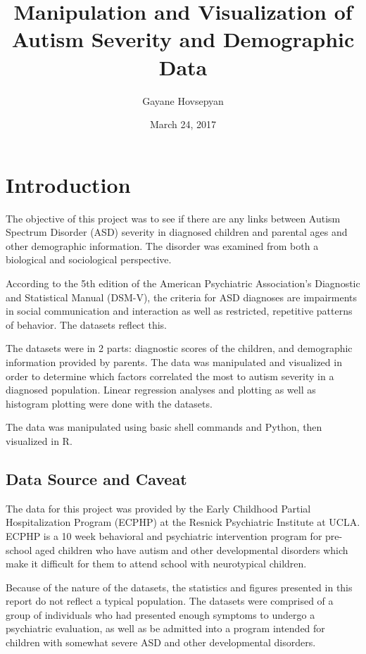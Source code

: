 \documentclass{article}
\title{Manipulation and Visualization of Autism Severity and Demographic Data} %
\author{Gayane Hovsepyan}
\date{March 24, 2017}
\begin{document}
\maketitle

\section{Introduction} %

The objective of this project was to see if there are any links between Autism Spectrum Disorder (ASD) severity in diagnosed children and parental ages and other demographic information. The disorder was examined from both a biological and sociological perspective.

According to the 5th edition of the American Psychiatric Association's Diagnostic and Statistical Manual (DSM-V), the criteria for ASD diagnoses are impairments in social communication and interaction as well as restricted, repetitive patterns of behavior. The datasets reflect this.

The datasets were in 2 parts: diagnostic scores of the children, and demographic information provided by parents. The data was manipulated and visualized in order to determine which factors correlated the most to autism severity in a diagnosed population. Linear regression analyses and plotting as well as histogram plotting were done with the datasets.

The data was manipulated using basic shell commands and Python, then visualized in R. 

\subsection{Data Source and Caveat} %

The data for this project was provided by the Early Childhood Partial Hospitalization Program (ECPHP) at the Resnick Psychiatric Institute at UCLA. ECPHP is a 10 week behavioral and psychiatric intervention program for pre-school aged children who have autism and other developmental disorders which make it difficult for them to attend school with neurotypical children.

Because of the nature of the datasets, the statistics and figures presented in this report do not reflect a typical population. The datasets were comprised of a group of individuals who had presented enough symptoms to undergo a psychiatric evaluation, as well as be admitted into a program intended for children with somewhat severe ASD and other developmental disorders.
\end{document}

